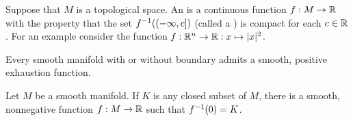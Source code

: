 \dfn Suppose that $M$ is a topological space. An  is a continuous function $f:M\rightarrow \mathbb{R}$ with the property that the set $f^{-1}((-\infty, c])$ (called a ) is compact for each $c\in \mathbb{R}$. For an example consider the function $f:\mathbb{R}^n\rightarrow \mathbb{R}:x\mapsto |x|^2$.

\setcounter{thm}{27}

\begin{prop}
Every smooth manifold with or without boundary admits a smooth, positive exhaustion function.
\end{prop}

\begin{thm}
Let $M$ be a smooth manifold. If $K$ is any closed subset of $M$, there is a smooth, nonnegative function $f:M\rightarrow \mathbb{R}$ such that $f^{-1}(0) = K$.
\end{thm}

